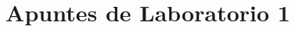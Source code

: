 \documentclass[letterpaper,11pt]{report}
\begin{document}
\sffamily

\title{Apuntes de Laboratorio 1}
\maketitle

\tableofcontents

\end{document}

